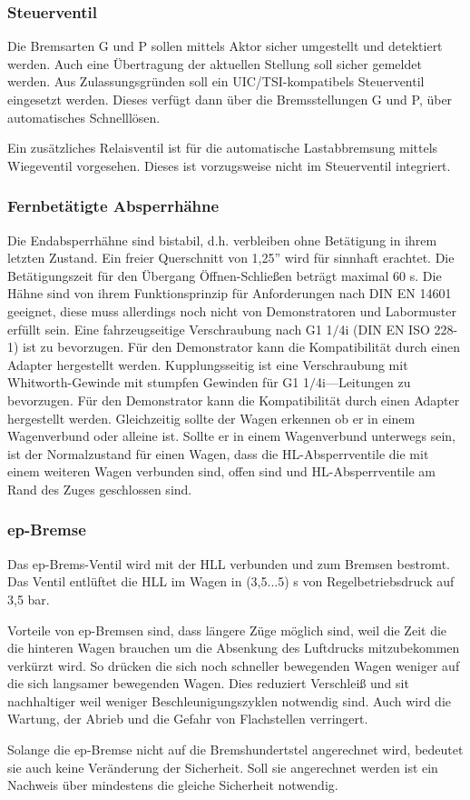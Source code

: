 \subsubsection{Steuerventil}
Die Bremsarten G und P sollen mittels Aktor sicher umgestellt und detektiert werden. Auch eine Übertragung der aktuellen Stellung soll sicher gemeldet werden. Aus Zulassungsgründen soll ein UIC/TSI-kompatibels Steuerventil eingesetzt werden. Dieses verfügt dann über die Bremsstellungen G und P, über automatisches Schnelllösen. \par
Ein zusätzliches Relaisventil ist für die automatische Lastabbremsung mittels Wiegeventil vorgesehen. Dieses ist vorzugsweise nicht im Steuerventil integriert.
\subsubsection{Fernbetätigte Absperrhähne}
Die Endabsperrhähne sind bistabil, d.h. verbleiben ohne Betätigung in ihrem letzten Zustand. Ein freier Querschnitt von 1,25'' wird für sinnhaft erachtet. Die Betätigungszeit für den Übergang Öffnen-Schließen beträgt maximal 60 s. Die Hähne sind von ihrem Funktionsprinzip für Anforderungen nach DIN EN 14601 geeignet, diese muss allerdings noch nicht von Demonstratoren und Labormuster erfüllt sein. Eine fahrzeugseitige Verschraubung nach G1 1$/$4i (DIN EN ISO 228-1) ist zu bevorzugen. Für den Demonstrator kann die Kompatibilität durch einen Adapter hergestellt werden. Kupplungsseitig ist eine Verschraubung mit Whitworth-Gewinde mit stumpfen Gewinden für G1 1$⁄$4i—Leitungen zu bevorzugen. Für den Demonstrator kann die Kompatibilität durch einen Adapter hergestellt werden.
Gleichzeitig sollte der Wagen erkennen ob er in einem Wagenverbund oder alleine ist. Sollte er in einem Wagenverbund unterwegs sein, ist der Normalzustand für einen Wagen, dass die HL-Absperrventile die mit einem weiteren Wagen verbunden sind, offen sind und HL-Absperrventile am Rand des Zuges geschlossen sind.
\subsubsection{ep-Bremse}
Das ep-Brems-Ventil wird mit der HLL verbunden und zum Bremsen bestromt. Das Ventil entlüftet die HLL im Wagen in (3,5...5) s von Regelbetriebsdruck auf 3,5 bar.\par
Vorteile von ep-Bremsen sind, dass längere Züge möglich sind, weil die Zeit die die hinteren Wagen brauchen um die Absenkung des Luftdrucks mitzubekommen verkürzt wird. So drücken die sich noch schneller bewegenden Wagen weniger auf die sich langsamer bewegenden Wagen. Dies reduziert Verschleiß und sit nachhaltiger weil weniger Beschleunigungszyklen notwendig sind. Auch wird die Wartung, der Abrieb und die Gefahr von Flachstellen verringert.\par
Solange die ep-Bremse nicht auf die Bremshundertstel angerechnet wird, bedeutet sie auch keine Veränderung der Sicherheit. Soll sie angerechnet werden ist ein Nachweis über mindestens die gleiche Sicherheit notwendig.

